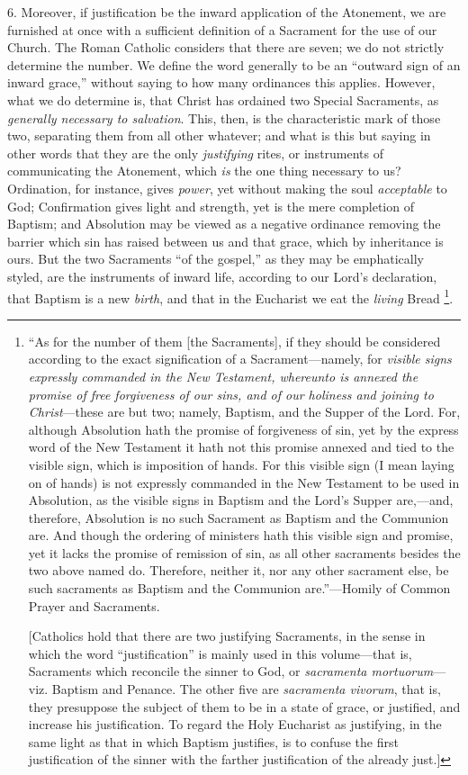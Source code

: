 6. Moreover, if justification be the inward application of the
Atonement, we are furnished at once with a sufficient definition of a
Sacrament for the use of our Church. The Roman Catholic considers that
there are seven; we do not strictly determine the number. We define the word generally to be an ``outward sign of an inward
grace,'' without saying to how many ordinances this applies.
However, what we do determine is, that Christ has ordained two Special
Sacraments, as \emph{generally necessary to salvation}. This, then, is
the characteristic mark of those two, separating them from all other
whatever; and what is this but saying in other words that they are the
only \emph{justifying} rites, or instruments of communicating the
Atonement, which \emph{is} the one thing necessary to us? Ordination,
for instance, gives \emph{power}, yet without making the soul \emph{acceptable}
to God; Confirmation gives light and strength, yet is the mere
completion of Baptism; and Absolution may be viewed as a negative
ordinance removing the barrier which sin has raised between us and
that grace, which by inheritance is ours. But the two Sacraments
``of the gospel,'' as they may be emphatically styled, are the
instruments of inward life, according to our Lord's declaration, that
Baptism is a new \emph{birth}, and that in the Eucharist we eat the \emph{living}
Bread \footnote{``As for
the number of them [the Sacraments], if they should be considered
according to the exact signification of a Sacrament—namely, for \emph{visible
signs expressly commanded in the New Testament, whereunto is annexed
the promise of free forgiveness of our sins, and of our holiness and
joining to Christ}—these are but two; namely, Baptism, and the
Supper of the Lord. For, although Absolution hath the promise of
forgiveness of sin, yet by the express word of the New Testament it
hath not this promise annexed and tied to the visible sign, which is
imposition of hands. For this visible sign (I mean laying on of hands)
is not expressly commanded in the New Testament to be used in
Absolution, as the visible signs in Baptism and the Lord's Supper are,—and,
therefore, Absolution is no such Sacrament as Baptism and the
Communion are. And though the ordering of ministers hath this visible
sign and promise, yet it lacks the promise of remission of sin, as
all other sacraments besides the two above named do. Therefore,
neither it, nor any other sacrament else, be such sacraments as
Baptism and the Communion are.''—Homily of Common Prayer and
Sacraments.

[Catholics hold that there are two justifying Sacraments, in the
sense in which the word ``justification'' is mainly used in
this volume—that is, Sacraments which reconcile the sinner to God,
or \emph{sacramenta mortuorum}—viz. Baptism and Penance. The other
five are \emph{sacramenta vivorum}, that is, they presuppose the
subject of them to be in a state of grace, or justified, and increase
his justification. To regard the Holy Eucharist as justifying, in the
same light as that in which Baptism justifies, is to confuse the first
justification of the sinner with the farther justification of the
already just.]}.

